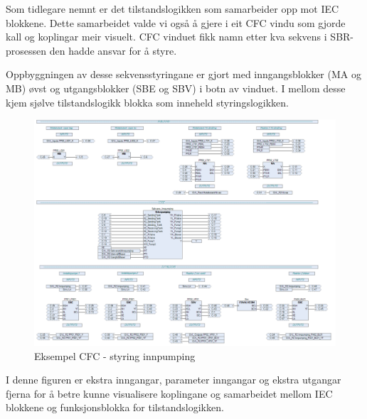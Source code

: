 Som tidlegare nemnt er det tilstandslogikken som samarbeider opp mot \gls{IEC} blokkene. Dette samarbeidet valde vi også å gjere i eit
\gls{CFC} vindu som gjorde kall og koplingar meir visuelt. \gls{CFC} vinduet fikk namn etter kva sekvens i \gls{SBR}-prosessen
den hadde ansvar for å styre. 

Oppbyggningen av desse sekvensstyringane er gjort med inngangsblokker (\gls{MA} og \gls{MB}) øvst og utgangsblokker (\gls{SBE} og \gls{SBV}) i botn av vinduet.
I mellom desse kjem sjølve tilstandslogikk blokka som inneheld styringslogikken.

\begin{figure}[htbp]
    \centering
    \includegraphics[width=1\textwidth]{Bilder/Heile_innpump.png}
    \caption{Eksempel \gls{CFC} - styring innpumping}\label{fig:CFCInnpumping}
\end{figure}

I denne figuren er ekstra inngangar, parameter inngangar og ekstra utgangar fjerna for å betre kunne visualisere koplingane og samarbeidet mellom
\gls{IEC} blokkene og funksjonsblokka for tilstandslogikken.

\newpage

